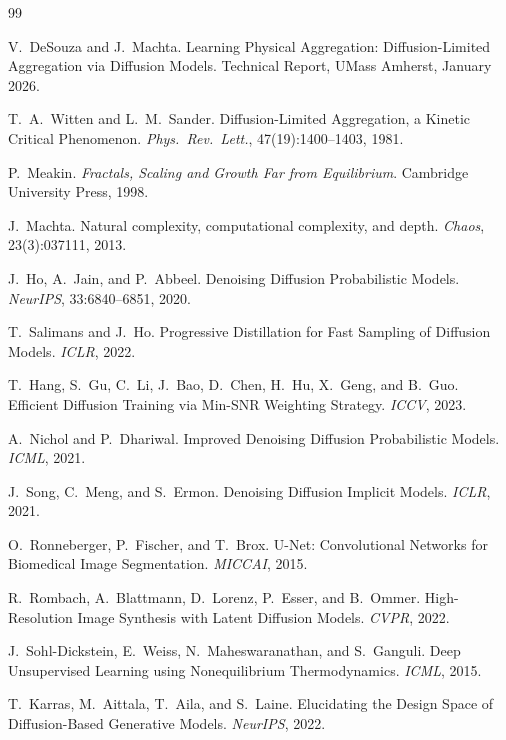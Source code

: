 \documentclass[11pt]{article}
\begin{document}
\begin{thebibliography}{99}

V.\ DeSouza and J.\ Machta. Learning Physical Aggregation: Diffusion-Limited Aggregation via Diffusion Models. Technical Report, UMass Amherst, January 2026.

T.\ A.\ Witten and L.\ M.\ Sander. Diffusion-Limited Aggregation, a Kinetic Critical Phenomenon. \textit{Phys.\ Rev.\ Lett.}, 47(19):1400--1403, 1981.

P.\ Meakin. \textit{Fractals, Scaling and Growth Far from Equilibrium}. Cambridge University Press, 1998.

J.\ Machta. Natural complexity, computational complexity, and depth. \textit{Chaos}, 23(3):037111, 2013.

J.\ Ho, A.\ Jain, and P.\ Abbeel. Denoising Diffusion Probabilistic Models. \textit{NeurIPS}, 33:6840--6851, 2020.

T.\ Salimans and J.\ Ho. Progressive Distillation for Fast Sampling of Diffusion Models. \textit{ICLR}, 2022.

T.\ Hang, S.\ Gu, C.\ Li, J.\ Bao, D.\ Chen, H.\ Hu, X.\ Geng, and B.\ Guo. Efficient Diffusion Training via Min-SNR Weighting Strategy. \textit{ICCV}, 2023.

A.\ Nichol and P.\ Dhariwal. Improved Denoising Diffusion Probabilistic Models. \textit{ICML}, 2021.

J.\ Song, C.\ Meng, and S.\ Ermon. Denoising Diffusion Implicit Models. \textit{ICLR}, 2021.

O.\ Ronneberger, P.\ Fischer, and T.\ Brox. U-Net: Convolutional Networks for Biomedical Image Segmentation. \textit{MICCAI}, 2015.

R.\ Rombach, A.\ Blattmann, D.\ Lorenz, P.\ Esser, and B.\ Ommer. High-Resolution Image Synthesis with Latent Diffusion Models. \textit{CVPR}, 2022.

J.\ Sohl-Dickstein, E.\ Weiss, N.\ Maheswaranathan, and S.\ Ganguli. Deep Unsupervised Learning using Nonequilibrium Thermodynamics. \textit{ICML}, 2015.

T.\ Karras, M.\ Aittala, T.\ Aila, and S.\ Laine. Elucidating the Design Space of Diffusion-Based Generative Models. \textit{NeurIPS}, 2022.


\end{thebibliography}
\end{document}
